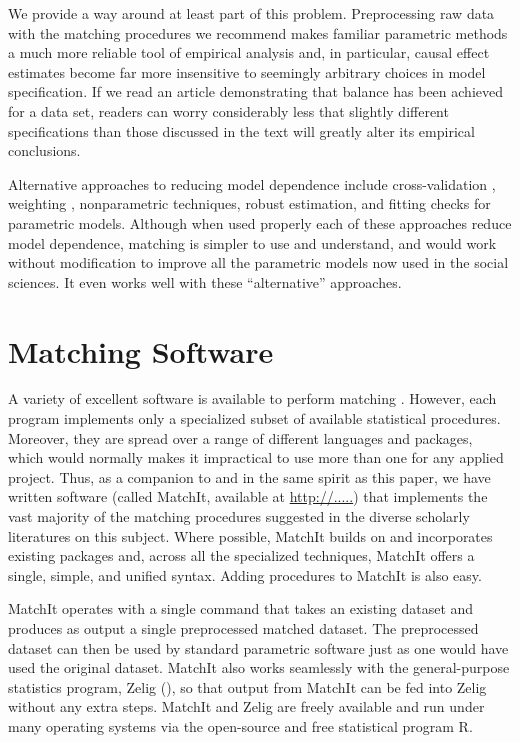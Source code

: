 \documentclass[11pt,titlepage]{article}
\begin{document}
We provide a way around at least part of this problem.  Preprocessing
raw data with the matching procedures we recommend makes familiar
parametric methods a much more reliable tool of empirical analysis
and, in particular, causal effect estimates become far more
insensitive to seemingly arbitrary choices in model specification.  If
we read an article demonstrating that balance has been achieved for a
data set, readers can worry considerably less that slightly different
specifications than those discussed in the text will greatly alter its
empirical conclusions.

Alternative approaches to reducing model dependence include
cross-validation \citep{BlaSmi04}, weighting \citep{RobRot03,
  HirImbRid03}, nonparametric techniques, robust estimation, and
fitting checks for parametric models.  Although when used properly
each of these approaches reduce model dependence, matching is simpler
to use and understand, and would work without modification to improve
all the parametric models now used in the social sciences.  It even
works well with these ``alternative'' approaches.

\appendix
\section{Matching Software}\label{s:matchit}

A variety of excellent software is available to perform matching
\citep{AbaDruLeb02, BecIch02, BerKos03, Hansen05, LeuSia04, Parsons00,
  Parsons01, Sekhon04}.  However, each program implements only a
specialized subset of available statistical procedures.  Moreover,
they are spread over a range of different languages and packages,
which would normally makes it impractical to use more than one for any
applied project.  Thus, as a companion to and in the same spirit as
this paper, we have written software (called MatchIt, available at
\url{http://.....})  that implements the vast majority of the matching
procedures suggested in the diverse scholarly literatures on this
subject.  Where possible, MatchIt builds on and incorporates existing
packages and, across all the specialized techniques, MatchIt offers a
single, simple, and unified syntax.  Adding procedures to MatchIt is
also easy.

MatchIt operates with a single command that takes an existing dataset
and produces as output a single preprocessed matched dataset.  The
preprocessed dataset can then be used by standard parametric software
just as one would have used the original dataset.  MatchIt also works
seamlessly with the general-purpose statistics program, Zelig
(\citealt{ImaKinLau04}), so that output from MatchIt can be fed into
Zelig without any extra steps.  MatchIt and Zelig are freely available
and run under many operating systems via the open-source and free
statistical program R.

\baselineskip 


\end{document}
